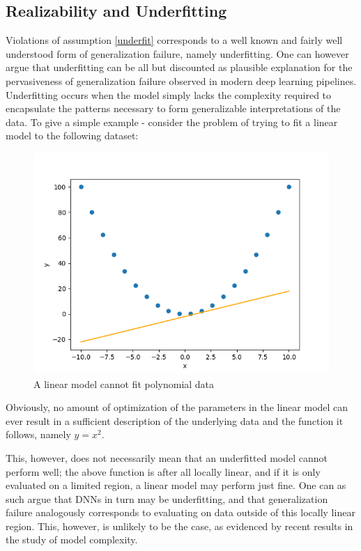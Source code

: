 	\subsection{Realizability and Underfitting}
		Violations of assumption \ref{underfit} corresponds to a well known and fairly well understood form of generalization failure, namely underfitting. One can however argue that underfitting can be all but discounted as plausible explanation for the pervasiveness of generalization failure observed in modern deep learning pipelines. Underfitting occurs when the model simply lacks the complexity required to encapsulate the patterns necessary to form generalizable interpretations of the data. To give a simple example - consider the problem of trying to fit a linear model to the following dataset: 
		\begin{figure}[h]
			\includegraphics[width=\linewidth]{illustrations/regression_example.png}
			\caption{A linear model cannot fit polynomial data}
			\label{underfit example}
		\end{figure}
		Obviously, no amount of optimization of the parameters in the linear model can ever result in a sufficient description of the underlying data and the function it follows, namely \(y=x^2\). 
		
		This, however, does not necessarily mean that an underfitted model cannot perform well; the above function is after all locally linear, and if it is only evaluated on a limited region, a linear model may perform just fine. One can as such argue that DNNs in turn may be underfitting, and that generalization failure analogously corresponds to evaluating on data outside of this locally linear region. This, however, is unlikely to be the case, as evidenced by recent results in the study of model complexity.
		
